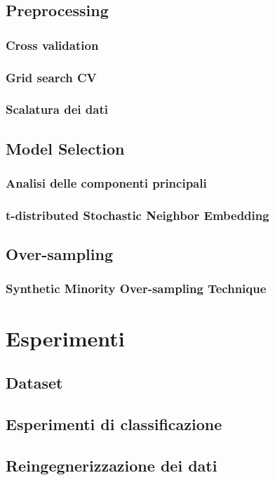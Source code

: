 \documentclass[12pt, twoside, letterpaper]{report}
\begin{document}
		\section{Preprocessing}
			\subsection{Cross validation}
			\subsection{Grid search CV}
			\subsection{Scalatura dei dati}
		\section{Model Selection}			
			\subsection{Analisi delle componenti principali}
			\subsection{t-distributed Stochastic Neighbor Embedding}
		\section{Over-sampling}
			\subsection{Synthetic Minority Over-sampling Technique}
		
	\chapter{Esperimenti}
		\section{Dataset}
		\section{Esperimenti di classificazione}
		\section{Reingegnerizzazione dei dati}
\end{document}
